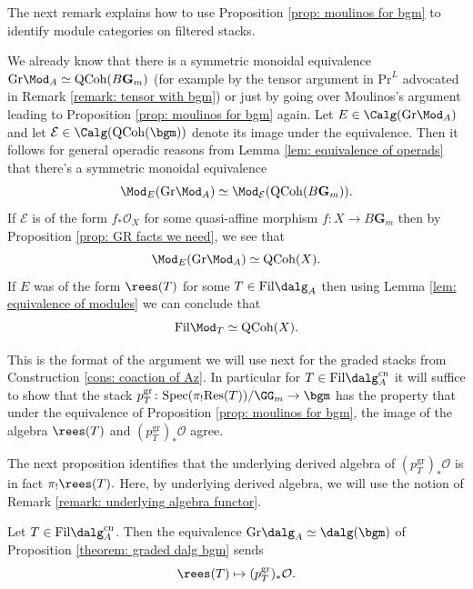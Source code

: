 \documentclass[10pt,reqno]{amsart}
\numberwithin{equation}{section}
\newcommand{\cO}{{\mathcal{O}}}
\newcommand{\cE}{\mathcal{E}}
\newcommand{\G}{\mathbf{G}}
\newcommand{\spec}{{\mathrm{Spec}}}
\newcommand{\Qcoh}{\mathrm{QCoh}}
\newcommand{\Gr}{\mathrm{Gr}}
\newcommand{\fil}{\mathrm{Fil}}
\newcommand{\gr}{\mathrm{gr}}
\newcommand{\prl}{\mathrm{Pr}^L}
\newcommand{\cn}{\mathrm{cn}}
\newcommand{\res}{\mathrm{Res}}
\begin{document}
The next remark explains how to use Proposition \ref{prop: moulinos for bgm} to identify module categories on filtered stacks.

\begin{remark}\label{remark: how to identify image of algebra object}
    We already know that there is a symmetric monoidal equivalence $\Gr\Mod_A\simeq \Qcoh(B\G_m)$ (for example by the tensor argument in $\prl$ advocated in Remark \ref{remark: tensor with bgm}) or just by going over Moulinos's argument leading to Proposition \ref{prop: moulinos for bgm} again. Let $E\in \Calg(\Gr\Mod_A)$ and let $\cE\in \Calg(\Qcoh(\bgm))$ denote its image under the equivalence. Then it follows for general operadic reasons from Lemma \ref{lem: equivalence of operads} that there's a symmetric monoidal equivalence $$\Mod_{E}(\Gr\Mod_A)\simeq \Mod_{\cE}(\Qcoh(B\G_m)).$$ If $\cE$ is of the form $f_*\cO_X$ for some quasi-affine morphism $f\colon X\to B\G_m$ then by Proposition \ref{prop: GR facts we need}, we see that $$\Mod_E(\Gr\Mod_A)\simeq \Qcoh(X).$$
    If $E$ was of the form $\rees(T)$ for some $T\in \fil\dalg_A$ then using Lemma \ref{lem: equivalence of modules} we can conclude that $$\fil\Mod_T\simeq \Qcoh(X).$$

    This is the format of the argument we will use next for the graded stacks from Construction \ref{cons: coaction of Az}. In particular for $T\in \fil\dalg_A^\cn$ it will suffice to show that the stack $p_T^\gr\colon \spec(\pi_!\res(T))/\GG_m\to \bgm$ has the property that under the equivalence of Proposition \ref{prop: moulinos for bgm}, the image of the algebra $\rees(T)$ and $(p_T^\gr)_*\cO$ agree.
\end{remark}


The next proposition identifies that the underlying derived algebra of $(p_T^\gr)_*\cO$ is in fact $\pi_!\rees(T).$ Here, by underlying derived algebra, we will use the notion of Remark \ref{remark: underlying algebra functor}.



\begin{proposition}\label{prop: gr sends correct algebra}
Let $T\in \fil\dalg_A^\cn$. Then the equivalence $\Gr\dalg_A\simeq \dalg(\bgm)$ of Proposition \ref{theorem: graded dalg bgm} sends $$\rees(T)\mapsto (p_T^\gr)_*\cO.$$
\end{proposition}
\end{document}
